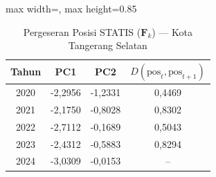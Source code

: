 \begin{table}[H]
\centering
\caption{Pergeseran Posisi STATIS ($\mathbf{F}_k$) --- Kota Tangerang Selatan} \label{tab:app2jarak_statis_skor_kota_tangerang_selatan}
\begin{adjustbox}{max width=\textwidth, max height=0.85\textheight}
\begin{tabular}{|c|c|c|c|}
\hline
\textbf{Tahun} & \textbf{PC1} & \textbf{PC2} & \textbf{$D(\text{pos}_t, \text{pos}_{t+1})$} \\
\hline
2020 & -2,2956 & -1,2331 & 0,4469 \\
2021 & -2,1750 & -0,8028 & 0,8302 \\
2022 & -2,7112 & -0,1689 & 0,5043 \\
2023 & -2,4312 & -0,5883 & 0,8294 \\
2024 & -3,0309 & -0,0153 & -- \\
\hline
\end{tabular}
\end{adjustbox}
\end{table}
